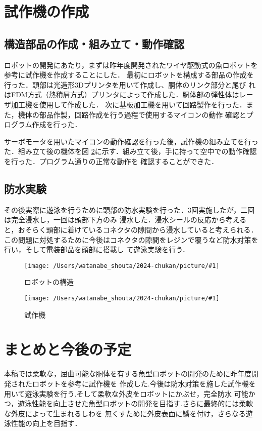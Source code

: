 \documentclass{jarticle}
\newcommand{\setPicture}[1]{\texttt{[image: /Users/watanabe\_shouta/2024-chukan/picture/\#1]}}
\begin{document}
\section{試作機の作成}
\subsection{構造部品の作成・組み立て・動作確認}
ロボットの開発にあたり，まずは昨年度開発されたワイヤ駆動式の魚ロボットを参考に試作機を作成することにした．
最初にロボットを構成する部品の作成を行った．頭部は光造形3Dプリンタを用いて作成し、胴体のリンク部分と尾び
れはFDM方式（熱積層方式）プリンタによって作成した．胴体部の弾性体はレーザ加工機を使用して作成した．
次に基板加工機を用いて回路製作を行った．また，機体の部品作製，回路作成を行う過程で使用するマイコンの動作
確認とプログラム作成を行った．

サーボモータを用いたマイコンの動作確認を行った後，試作機の組み立てを行った．組み立て後の機体を図
\ref{fig:fish-type}に示す．組み立て後，手に持って空中での動作確認を行った．プログラム通りの正常な動作を
確認することができた．

\subsection{防水実験}
その後実際に遊泳を行うために頭部の防水実験を行った．3回実施したが，二回は完全浸水し，一回は頭部下方のみ
浸水した．浸水シールの反応から考えると，おそらく頭部に着けているコネクタの隙間から浸水していると考えられる．
この問題に対処するために今後はコネクタの隙間をレジンで覆うなど防水対策を行い，そして電装部品を頭部に搭載し
て遊泳実験を行う．

\begin{figure}[t]
   \centering
   \setPicture{tentativeschematic.png}
   \vspace*{-4mm}
   \caption{ロボットの構造}
   \label{fig:structure}
\end{figure}

\begin{figure}[t]
   \centering
   \setPicture{fish-copy.jpg}
   \vspace*{-4mm}
   \caption{試作機}
   \label{fig:fish-type}
\end{figure}

\vspace*{-2mm}
\section{まとめと今後の予定}
本稿では柔軟な，屈曲可能な胴体を有する魚型ロボットの開発のために昨年度開発されたロボットを参考に試作機を
作成した.今後は防水対策を施した試作機を用いて遊泳実験を行う.そして柔軟な外皮をロボットにかぶせ，完全防水
可能かつ，遊泳性能を向上させた魚型ロボットの開発を目指す.さらに最終的には柔軟な外皮によって生まれるしわを
無くすために外皮表面に鱗を付け，さらなる遊泳性能の向上を目指す．
\end{document}
